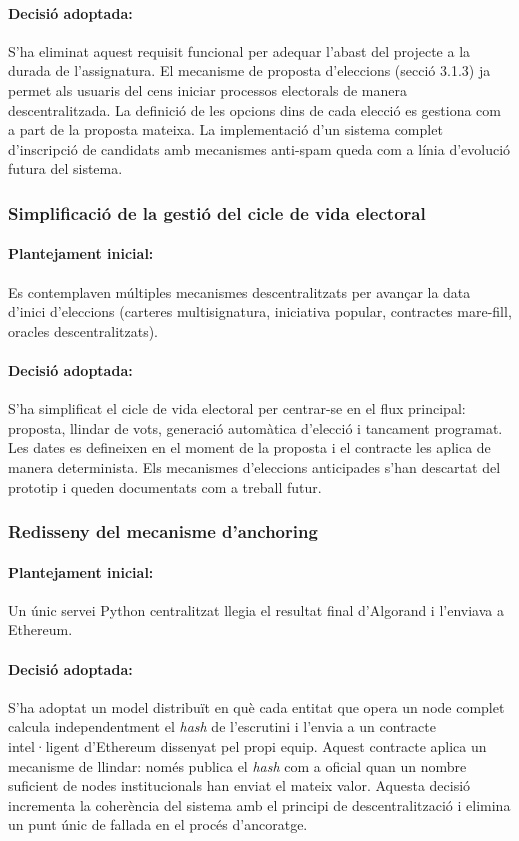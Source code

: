 \paragraph{Decisió adoptada:}
S'ha eliminat aquest requisit funcional per adequar l'abast del projecte a la durada de l'assignatura. El mecanisme de proposta d'eleccions (secció 3.1.3) ja permet als usuaris del cens iniciar processos electorals de manera descentralitzada. La definició de les opcions dins de cada elecció es gestiona com a part de la proposta mateixa. La implementació d'un sistema complet d'inscripció de candidats amb mecanismes anti-spam queda com a línia d'evolució futura del sistema.

\subsubsection{Simplificació de la gestió del cicle de vida electoral}

\paragraph{Plantejament inicial:}
Es contemplaven múltiples mecanismes descentralitzats per avançar la data d'inici d'eleccions (carteres multisignatura, iniciativa popular, contractes mare-fill, oracles descentralitzats).

\paragraph{Decisió adoptada:}
S'ha simplificat el cicle de vida electoral per centrar-se en el flux principal: proposta, llindar de vots, generació automàtica d'elecció i tancament programat. Les dates es defineixen en el moment de la proposta i el contracte les aplica de manera determinista. Els mecanismes d'eleccions anticipades s'han descartat del prototip i queden documentats com a treball futur.

\subsubsection{Redisseny del mecanisme d'anchoring}

\paragraph{Plantejament inicial:}
Un únic servei Python centralitzat llegia el resultat final d'Algorand i l'enviava a Ethereum.

\paragraph{Decisió adoptada:}
S'ha adoptat un model distribuït en què cada entitat que opera un node complet calcula independentment el \textit{hash} de l'escrutini i l'envia a un contracte intel·ligent d'Ethereum dissenyat pel propi equip. Aquest contracte aplica un mecanisme de llindar: només publica el \textit{hash} com a oficial quan un nombre suficient de nodes institucionals han enviat el mateix valor. Aquesta decisió incrementa la coherència del sistema amb el principi de descentralització i elimina un punt únic de fallada en el procés d'ancoratge.

